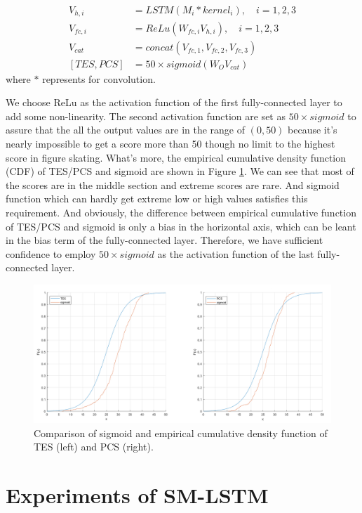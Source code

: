 \documentclass{article}
\begin{document}
\begin{align}
V_{h,i}&=LSTM(M_i \ast kernel_i), \quad i=1,2,3\\
V_{fc,i}&=ReLu(W_{fc,i}V_{h,i}), \quad i=1,2,3\\
V_{cat}&=concat(V_{fc,1},V_{fc,2},V_{fc,3})\\
[TES,PCS]&=50\times sigmoid(W_OV_{cat})
\end{align}
where $\ast$ represents for convolution.\par

We choose ReLu as the activation function of the first fully-connected layer to add some non-linearity. The second activation function are set as $50\times sigmoid$ to assure that the all the output values are in the range of $(0,50)$ because it's nearly impossible to get a score more than 50 though no limit to the highest score in figure skating. What's more, the empirical cumulative density function (CDF) of TES/PCS and sigmoid are shown in Figure \ref{sigmoid}. We can see that most of the scores are in the middle section and extreme scores are rare. And sigmoid function which can hardly get extreme low or high values satisfies this requirement. And obviously, the difference between empirical cumulative function of TES/PCS and sigmoid is only a bias in the horizontal axis, which can be leant in the bias term of the fully-connected layer. Therefore, we have sufficient confidence to employ $50\times sigmoid$ as the activation function of the last fully-connected layer.

\begin{figure}[H]
	\centering
	\includegraphics[width=14cm]{sigmoid}
	\caption{Comparison of sigmoid and empirical cumulative density function of TES (left) and PCS (right).}
	\label{sigmoid}
\end{figure}


\section{Experiments of SM-LSTM}
\end{document}
